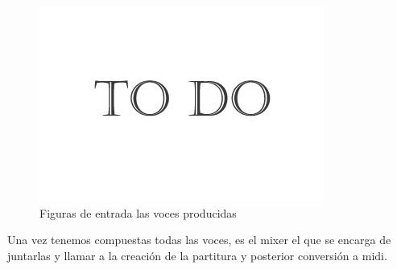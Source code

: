 		\begin{figure}[htbp]
		\centering
		\hspace*{0.0in}
		\includegraphics[scale=0.57]{graphics/todo.png}
		\caption{Figuras de entrada las voces producidas}
		\label{fig:Figura1Mixer}
		\end{figure}

Una vez tenemos compuestas todas las voces, es el mixer el que se encarga de juntarlas y llamar a la creación de la partitura y posterior conversión a midi.
